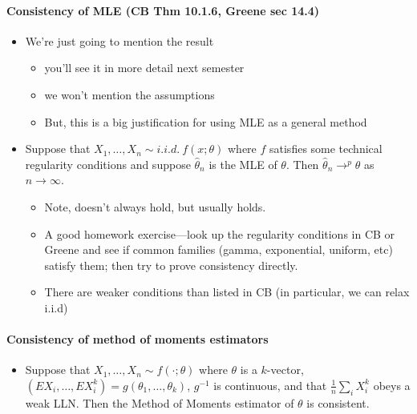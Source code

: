 \paragraph{Consistency of MLE (CB Thm 10.1.6, Greene sec 14.4)}
\label{sec-1-6-3}

\begin{itemize}
\item We're just going to mention the result
\begin{itemize}
\item you'll see it in more detail next semester
\item we won't mention the assumptions
\item But, this is a big justification for using MLE as a general method
\end{itemize}
\item Suppose that $X_1,\dots,X_n \sim i.i.d.\ f(x; \theta)$ where
        $f$ satisfies some technical regularity conditions and suppose
        $\hat\theta_n$ is the MLE of $\theta$.  Then $\hat\theta_n
        \to^p \theta$ as $n \to \infty$.
\begin{itemize}
\item Note, doesn't always hold, but usually holds.
\item A good homework exercise---look up the regularity conditions
          in CB or Greene and see if common families (gamma,
          exponential, uniform, etc) satisfy them; then try to prove consistency
          directly.
\item There are weaker conditions than listed in CB (in particular,
          we can relax i.i.d)
\end{itemize}
\end{itemize}
\paragraph{Consistency of method of moments estimators}
\label{sec-1-6-4}

\begin{itemize}
\item Suppose that $X_1,\dots,X_n \sim f(\cdot; \theta)$ where
        $\theta$ is a $k$-vector, $(E X_i,\dots,E X_i^k) =
        g(\theta_1,\dots,\theta_k)$, $g^{-1}$ is continuous, and that
        $\frac{1}{n} \sum_i X_i^k$ obeys a weak LLN.  Then the Method
        of Moments estimator of $\theta$ is consistent.
\end{itemize}